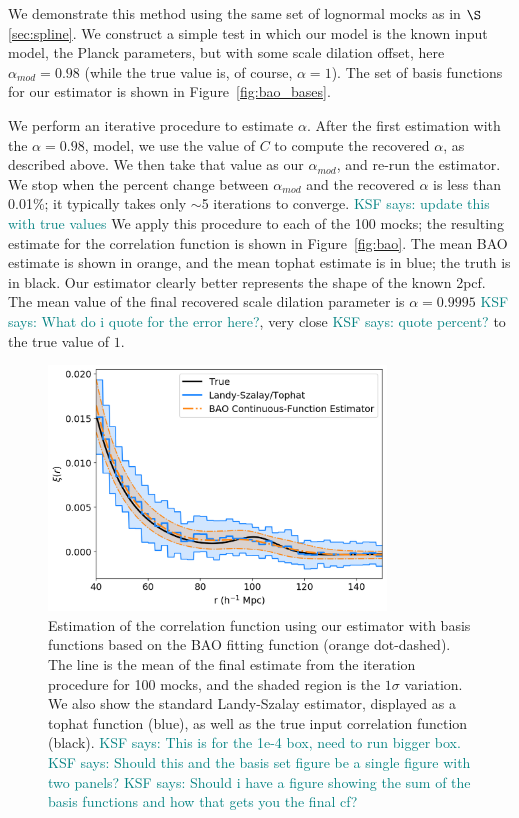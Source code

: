 \documentclass[modern]{aastex62}
\newcommand{\cf}{2pcf\xspace} %
\newcommand{\KSF}[1]{\textcolor{teal}{KSF says: #1}}
\begin{document}
We demonstrate this method using the same set of lognormal mocks as in $\S$\ref{sec:spline}.
We construct a simple test in which our model is the known input model, the Planck parameters, but with some scale dilation offset, here $\alpha_{mod}=0.98$ (while the true value is, of course, $\alpha=1$).
The set of basis functions for our estimator is shown in Figure~\ref{fig:bao_bases}.

We perform an iterative procedure to estimate $\alpha$.
After the first estimation with the $\alpha=0.98$, model, we use the value of $C$ to compute the recovered $\alpha$, as described above.
We then take that value as our $\alpha_{mod}$, and re-run the estimator.
We stop when the percent change between $\alpha_{mod}$ and the recovered $\alpha$ is less than 0.01\%; it typically takes only $\sim$5 iterations to converge. \KSF{update this with true values}
We apply this procedure to each of the 100 mocks; the resulting estimate for the correlation function is shown in Figure~\ref{fig:bao}.
The mean BAO estimate is shown in orange, and the mean tophat estimate is in blue; the truth is in black.
Our estimator clearly better represents the shape of the known \cf.
The mean value of the final recovered scale dilation parameter is $\alpha=0.9995$ \KSF{What do i quote for the error here?}, very close \KSF{quote percent?} to the true value of $1$.

\label{fig:bao}
\begin{figure}[th]
\centering
    \includegraphics[width=0.8\textwidth]{bao}
    \caption{Estimation of the correlation function using our estimator with basis functions based on the BAO fitting function (orange dot-dashed). The line is the mean of the final estimate from the iteration procedure for 100 mocks, and the shaded region is the $1\sigma$ variation. We also show the standard Landy-Szalay estimator, displayed as a tophat function (blue), as well as the true input correlation function (black). \KSF{This is for the 1e-4 box, need to run bigger box.} \KSF{Should this and the basis set figure be a single figure with two panels?} \KSF{Should i have a figure showing the sum of the basis functions and how that gets you the final cf?}}
\end{figure}
\end{document}
